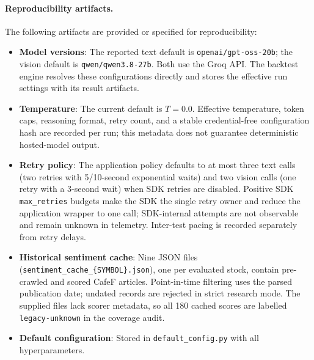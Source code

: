 \paragraph{Reproducibility artifacts.}
The following artifacts are provided or specified for reproducibility:
\begin{itemize}
\item \textbf{Model versions}: The reported text default is \texttt{openai/gpt-oss-20b}; the vision default is \texttt{qwen/qwen3.8-27b}. Both use the Groq API. The backtest engine resolves these configurations directly and stores the effective run settings with its result artifacts.
\item \textbf{Temperature}: The current default is $T=0.0$. Effective temperature, token caps, reasoning format, retry count, and a stable credential-free configuration hash are recorded per run; this metadata does not guarantee deterministic hosted-model output.
\item \textbf{Retry policy}: The application policy defaults to at most three text calls (two retries with 5/10-second exponential waits) and two vision calls (one retry with a 3-second wait) when SDK retries are disabled. Positive SDK \texttt{max\_retries} budgets make the SDK the single retry owner and reduce the application wrapper to one call; SDK-internal attempts are not observable and remain unknown in telemetry. Inter-test pacing is recorded separately from retry delays.
\item \textbf{Historical sentiment cache}: Nine JSON files (\texttt{sentiment\_cache\_\{SYMBOL\}.json}), one per evaluated stock, contain pre-crawled and scored CafeF articles. Point-in-time filtering uses the parsed publication date; undated records are rejected in strict research mode. The supplied files lack scorer metadata, so all 180 cached scores are labelled \texttt{legacy-unknown} in the coverage audit.
\item \textbf{Default configuration}: Stored in \texttt{default\_config.py} with all hyperparameters.
\end{itemize}

